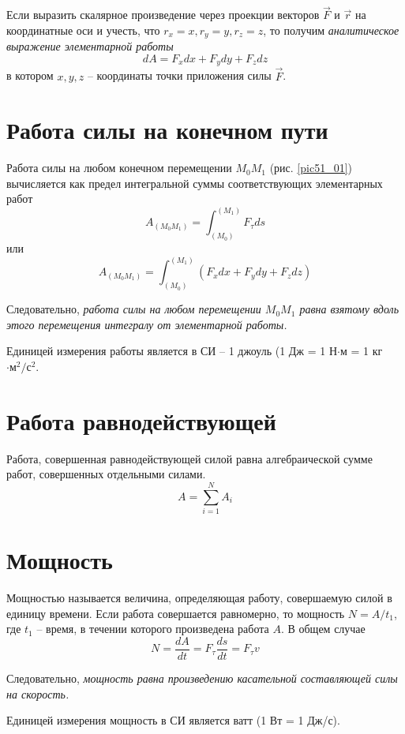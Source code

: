 Если выразить скалярное произведение через проекции векторов \( \vec{F} \) 
и \( \vec{r} \) на координатные оси и учесть, что 
\( r_x = x, r_y = y, r_z = z \), то получим \emph{аналитическое выражение 
элементарной работы}
\[ dA = F_x dx + F_y dy + F_z dz \]
в котором \( x, y, z \) -- координаты точки приложения силы \( \vec{F} \).

\section{Работа силы на конечном пути}
Работа силы на любом конечном перемещении \( M_0 M_1 \) (рис. \ref{pic51_01}) 
вычисляется как предел интегральной суммы соответствующих элементарных 
работ 
\[ A_{(M_0 M_1)} = \int_{(M_0)}^{(M_1)} F_\tau ds \]
или 
\[ 
    A_{(M_0 M_1)} = \int_{(M_0)}^{(M_1)} 
    \left( F_x dx + F_y dy + F_z dz \right)
\]

Следовательно, \emph{работа силы на любом перемещении \( M_0 M_1 \) равна 
взятому вдоль этого перемещения интегралу от элементарной работы.}

Единицей измерения работы является в СИ -- 1 джоуль 
(1 Дж = 1 Н\( \cdot \)м = 1 кг \( \cdot\text{м}^2/\text{с}^2 \).

\section{Работа равнодействующей}
Работа, совершенная равнодействующей силой равна алгебраической сумме 
работ, совершенных отдельными силами.
\[ A = \sum_{i=1}^{N} A_i \]

\section{Мощность}
Мощностью называется величина, определяющая работу, совершаемую силой 
в единицу времени. Если работа совершается равномерно, то мощность 
\( N = A/t_1 \), где \( t_1 \) -- время, в течении которого произведена 
работа \( A \). В общем случае
\[ N = \frac{dA}{dt} = F_\tau \frac{ds}{dt} = F_\tau v \]

Следовательно, \emph{мощность равна произведению касательной 
составляющей силы на скорость.}

Единицей измерения мощность в СИ является ватт (1 Вт = 1 Дж/с).

\newpage
